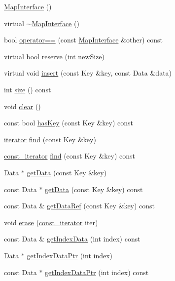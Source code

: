 \begin{CompactItemize}
\item 
\hyperlink{class_j_g_t_l_1_1_map_interface_6d49e996123c82dbc4ac2b526de5225d}{Map\-Interface} ()
\item 
virtual \hyperlink{class_j_g_t_l_1_1_map_interface_f6fd6f5a7643f34cae4b7b67ba98a832}{$\sim$Map\-Interface} ()
\item 
bool \hyperlink{class_j_g_t_l_1_1_map_interface_2f61fdf95543ba566256642eeed659f4}{operator==} (const \hyperlink{class_j_g_t_l_1_1_map_interface}{Map\-Interface} \&other) const 
\item 
virtual bool \hyperlink{class_j_g_t_l_1_1_map_interface_d5d7c32e4e413ef6fcd93ca53951ecf8}{reserve} (int new\-Size)
\item 
virtual void \hyperlink{class_j_g_t_l_1_1_map_interface_e416f8f15a065ea183c289932ef794c6}{insert} (const Key \&key, const Data \&data)
\item 
int \hyperlink{class_j_g_t_l_1_1_map_interface_416044d92d5c6d09ed79d13a775ba222}{size} () const
\item 
void \hyperlink{class_j_g_t_l_1_1_map_interface_af2d3667a3a9cf577177720e2b757d03}{clear} ()
\item 
const bool \hyperlink{class_j_g_t_l_1_1_map_interface_6a4c3571cb30d168d4a67dd2655a6b77}{has\-Key} (const Key \&key) const 
\item 
\hyperlink{class_j_g_t_l_1_1_map_interface_a8fcdbd899d0df84ce1aaa67d8dc000e}{iterator} \hyperlink{class_j_g_t_l_1_1_map_interface_7e97b54c29a253bd99caf2b0decb95a8}{find} (const Key \&key)
\item 
\hyperlink{class_j_g_t_l_1_1_map_interface_bbce6cc516069a5a504e0ae5b9aecd88}{const\_\-iterator} \hyperlink{class_j_g_t_l_1_1_map_interface_4ec2d9323c3d2e65179c38ea7558a222}{find} (const Key \&key) const 
\item 
Data $\ast$ \hyperlink{class_j_g_t_l_1_1_map_interface_b18a78bcb6d8ebac123e934aaa3fad0b}{get\-Data} (const Key \&key)
\item 
const Data $\ast$ \hyperlink{class_j_g_t_l_1_1_map_interface_266cbd67bcff93d17649c35254d18190}{get\-Data} (const Key \&key) const 
\item 
const Data \& \hyperlink{class_j_g_t_l_1_1_map_interface_3613d63a8096f923e4e220e5aa002403}{get\-Data\-Ref} (const Key \&key) const 
\item 
void \hyperlink{class_j_g_t_l_1_1_map_interface_7fe23525fa2fca5e47cb047332fb49d3}{erase} (\hyperlink{class_j_g_t_l_1_1_map_interface_bbce6cc516069a5a504e0ae5b9aecd88}{const\_\-iterator} iter)
\item 
const Data \& \hyperlink{class_j_g_t_l_1_1_map_interface_3bd1eca8bba2b057e09eb6579e26ad8f}{get\-Index\-Data} (int index) const
\item 
Data $\ast$ \hyperlink{class_j_g_t_l_1_1_map_interface_e2b0ad1f3959cf7f8d1c6ef07c5a8c2c}{get\-Index\-Data\-Ptr} (int index)
\item 
const Data $\ast$ \hyperlink{class_j_g_t_l_1_1_map_interface_cbbfe062862b57f4e0027026f81562a9}{get\-Index\-Data\-Ptr} (int index) const
\end{CompactItemize}
